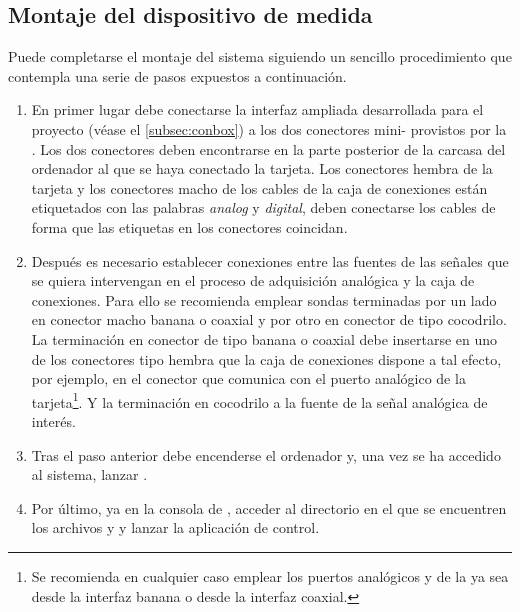 \subsection{Montaje del dispositivo de medida}

Puede completarse el montaje del sistema siguiendo un sencillo procedimiento que contempla una serie de pasos expuestos a continuación.

\begin{enumerate}
	\item En primer lugar debe conectarse la interfaz ampliada desarrollada para el proyecto (véase el \vref{subsec:conbox}) a los dos conectores mini- provistos por la \kpci{}. Los dos conectores deben encontrarse en la parte posterior de la carcasa del ordenador al que se haya conectado la tarjeta. Los conectores hembra de la tarjeta y los conectores macho de los cables de la caja de conexiones están etiquetados con las palabras \emph{analog} y \emph{digital}, deben conectarse los cables de forma que las etiquetas en los conectores coincidan.
	\item Después es necesario establecer conexiones entre las fuentes de las señales que se quiera intervengan en el proceso de adquisición analógica y la caja de conexiones. Para ello se recomienda emplear sondas terminadas por un lado en conector macho banana o coaxial y por otro en conector de tipo cocodrilo. La terminación en conector de tipo banana o coaxial debe insertarse en uno de los conectores tipo hembra que la caja de conexiones dispone a tal efecto, por ejemplo, en el conector que comunica con el puerto analógico  de la tarjeta\footnote{Se recomienda en cualquier caso emplear los puertos analógicos  y  de la \kpci{} ya sea desde la interfaz banana o desde la interfaz coaxial.}. Y la terminación en cocodrilo a la fuente de la señal analógica de interés.
	\item Tras el paso anterior debe encenderse el ordenador y, una vez se ha accedido al sistema, lanzar \matlab{}.
	\item Por último, ya en la consola de \matlab{}, acceder al directorio en el que se encuentren los archivos  y  y lanzar la aplicación de control.
\end{enumerate}
